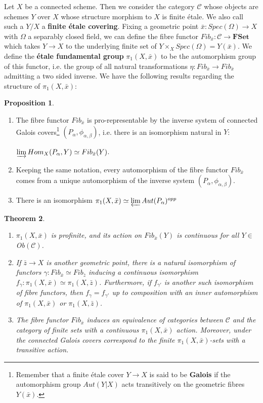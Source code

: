 \documentclass{ucbthesis}
\newtheorem{thm}{Theorem}[section]
\theoremstyle{definition}
\theoremstyle{theorem}
\newtheorem{prop}[thm]{Proposition}
\begin{document}
Let $X$ be a connected scheme. Then we consider the category $\mathcal{C}$ whose objects are schemes $Y$ over $X$ whose structure morphism to $X$ is finite \'{e}tale. We also call such a $Y/X$ a \textbf{finite \'{e}tale covering}. Fixing a geometric point $\bar{x}:Spec(\Omega)\rightarrow X$ with $\Omega$ a separably closed field, we can define the fibre functor $Fib_{\bar{x}}:\mathcal{C}\rightarrow \mathbf{FSet}$ which takes $Y\rightarrow X$ to the underlying finite set of $Y\times_{X}Spec(\Omega) = Y(\bar{x})$. We define the \textbf{\'{e}tale fundamental group} $\pi_{1}(X,\bar{x})$ to be the automorphism group of this functor, i.e. the group of all natural transformations $\eta:Fib_{\bar{x}}\rightarrow Fib_{\bar{x}}$ admitting a two sided inverse. We have the following results regarding the structure of $\pi_{1}(X,\bar{x})$:

\begin{prop}
\begin{enumerate}
 \item The fibre functor $Fib_{\bar{x}}$ is pro-representable by the inverse system of connected Galois covers\footnote{Remember that a finite \'{e}tale cover $Y\rightarrow X$ is said to be \textbf{Galois} if the automorphism group $Aut(Y|X)$ acts transitively on the geometric fibres $Y(\bar{x})$.} $(P_{\alpha},\phi_{\alpha,\beta})$, i.e. there is an isomorphism natural in $Y$: 
\begin{center}
$\varinjlim Hom_{X}(P_{\alpha},Y) \simeq Fib_{\bar{x}}(Y)$.
\end{center} 
\item Keeping the same notation, every automorphism of the fibre functor $Fib_{\bar{x}}$ comes from a unique automorphism of the inverse system $(P_{\alpha},\phi_{\alpha,\beta})$.
\item There is an isomorphism $\pi_{1}(X,\bar{x}) \simeq \varprojlim Aut(P_\alpha)^{opp}$
\end{enumerate}
\end{prop}

\begin{thm}
\begin{enumerate}
\item $\pi_{1}(X,\bar{x})$ is profinite, and its action on $Fib_{\bar{x}}(Y)$ is continuous for all $Y\in$Ob$(\mathcal{C})$. 
\item If $\bar{z}\rightarrow X$ is another geometric point, there is a natural isomorphism of functors
 $\gamma: Fib_{\bar{x}} \simeq Fib_{\bar{z}}$ inducing a continuous isomorphism $f_{\gamma}:\pi_{1}(X,\bar{x})
  \simeq \pi_{1}(X,\bar{z})$. Furthermore, if $f_{\gamma'}$ is another such isomorphism of fibre functors, then
   $f_{\gamma} = f_{\gamma'}$ up to composition with an inner automorphism of $\pi_{1}(X,\bar{x})$ or
    $\pi_{1}(X,\bar{z})$. 
\item The fibre functor $Fib_{\bar{x}}$ induces an equivalence of categories between $\mathcal{C}$ and the category of finite sets with a continuous $\pi_{1}(X,\bar{x})$ action. Moreover, under the connected Galois covers correspond to the finite $\pi_{1}(X,\bar{x})$-sets with a transitive action.
\end{enumerate} 
\end{thm}
\end{document}
